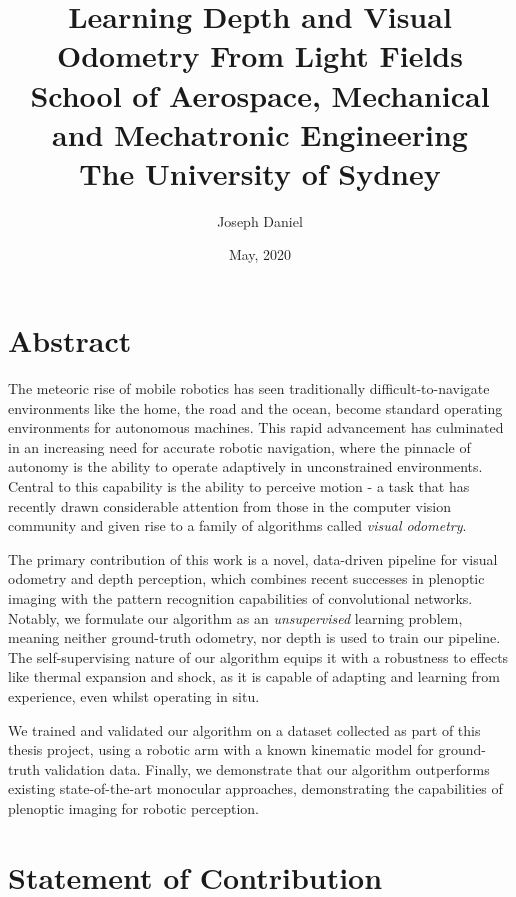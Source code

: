 \documentclass[openany]{book}
\title{\textbf{Learning Depth and Visual Odometry From Light Fields} \\
\large School of Aerospace, Mechanical and Mechatronic Engineering \\
\large The University of Sydney}
\date{May, 2020}
\author{Joseph Daniel}
\begin{document}
\frontmatter


\maketitle


\chapter*{Abstract}

The meteoric rise of mobile robotics has seen traditionally difficult-to-navigate environments like the home, the road and the ocean, become standard operating environments for autonomous machines. This rapid advancement has culminated in an increasing need for accurate robotic navigation, where the pinnacle of autonomy is the ability to operate adaptively in unconstrained environments. Central to this capability is the ability to perceive motion - a task that has recently drawn considerable attention from those in the computer vision community and given rise to a family of algorithms called \textit{visual odometry}. 

The primary contribution of this work is a novel, data-driven pipeline for visual odometry and depth perception, which combines recent successes in plenoptic imaging with the pattern recognition capabilities of convolutional networks. Notably, we formulate our algorithm as an \textit{unsupervised} learning problem, meaning neither ground-truth odometry, nor depth is used to train our pipeline. The self-supervising nature of our algorithm equips it with a robustness to effects like thermal expansion and shock, as it is capable of adapting and learning from experience, even whilst operating in situ.

We trained and validated our algorithm on a dataset collected as part of this thesis project, using a robotic arm with a known kinematic model for ground-truth validation data. Finally, we demonstrate that our algorithm outperforms existing state-of-the-art monocular approaches, demonstrating the capabilities of plenoptic imaging for robotic perception. 

\chapter*{Statement of Contribution}
\end{document}
